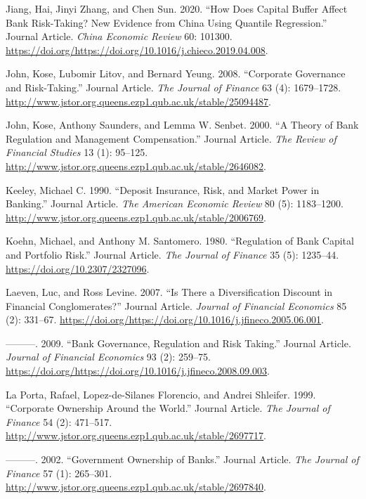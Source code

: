 \documentclass{article}
\begin{document}
\leavevmode\hypertarget{ref-RN53}{}%
Jiang, Hai, Jinyi Zhang, and Chen Sun. 2020. ``How Does Capital Buffer
Affect Bank Risk-Taking? New Evidence from China Using Quantile
Regression.'' Journal Article. \emph{China Economic Review} 60: 101300.
\url{https://doi.org/https://doi.org/10.1016/j.chieco.2019.04.008}.

\leavevmode\hypertarget{ref-RN54}{}%
John, Kose, Lubomir Litov, and Bernard Yeung. 2008. ``Corporate
Governance and Risk-Taking.'' Journal Article. \emph{The Journal of
Finance} 63 (4): 1679--1728.
\url{http://www.jstor.org.queens.ezp1.qub.ac.uk/stable/25094487}.

\leavevmode\hypertarget{ref-RN55}{}%
John, Kose, Anthony Saunders, and Lemma W. Senbet. 2000. ``A Theory of
Bank Regulation and Management Compensation.'' Journal Article.
\emph{The Review of Financial Studies} 13 (1): 95--125.
\url{http://www.jstor.org.queens.ezp1.qub.ac.uk/stable/2646082}.

\leavevmode\hypertarget{ref-RN56}{}%
Keeley, Michael C. 1990. ``Deposit Insurance, Risk, and Market Power in
Banking.'' Journal Article. \emph{The American Economic Review} 80 (5):
1183--1200.
\url{http://www.jstor.org.queens.ezp1.qub.ac.uk/stable/2006769}.

\leavevmode\hypertarget{ref-RN57}{}%
Koehn, Michael, and Anthony M. Santomero. 1980. ``Regulation of Bank
Capital and Portfolio Risk.'' Journal Article. \emph{The Journal of
Finance} 35 (5): 1235--44. \url{https://doi.org/10.2307/2327096}.

\leavevmode\hypertarget{ref-RN60}{}%
Laeven, Luc, and Ross Levine. 2007. ``Is There a Diversification
Discount in Financial Conglomerates?'' Journal Article. \emph{Journal of
Financial Economics} 85 (2): 331--67.
\url{https://doi.org/https://doi.org/10.1016/j.jfineco.2005.06.001}.

\leavevmode\hypertarget{ref-RN1}{}%
---------. 2009. ``Bank Governance, Regulation and Risk Taking.''
Journal Article. \emph{Journal of Financial Economics} 93 (2): 259--75.
\url{https://doi.org/https://doi.org/10.1016/j.jfineco.2008.09.003}.

\leavevmode\hypertarget{ref-RN58}{}%
La Porta, Rafael, Lopez-de-Silanes Florencio, and Andrei Shleifer. 1999.
``Corporate Ownership Around the World.'' Journal Article. \emph{The
Journal of Finance} 54 (2): 471--517.
\url{http://www.jstor.org.queens.ezp1.qub.ac.uk/stable/2697717}.

\leavevmode\hypertarget{ref-RN59}{}%
---------. 2002. ``Government Ownership of Banks.'' Journal Article.
\emph{The Journal of Finance} 57 (1): 265--301.
\url{http://www.jstor.org.queens.ezp1.qub.ac.uk/stable/2697840}.
\end{document}
